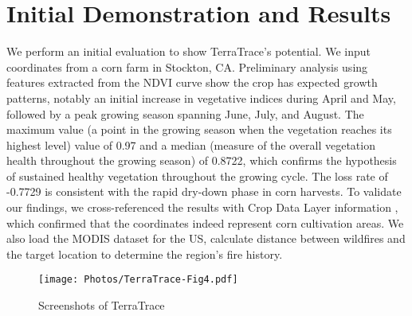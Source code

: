 \section{Initial Demonstration and Results}
We perform an initial evaluation to show TerraTrace's potential. We input coordinates from a corn farm in Stockton, CA. Preliminary analysis using features extracted from the NDVI curve show the crop has expected growth patterns, notably an initial increase in vegetative indices during April and May, followed by a peak growing season spanning June, July, and August. The maximum value (a point in the growing season when the vegetation reaches its highest level) value of 0.97 and a median (measure of the overall vegetation health throughout the growing season) of 0.8722, which confirms the hypothesis of sustained healthy vegetation throughout the growing cycle. The loss rate of -0.7729 is consistent with the rapid dry-down phase in corn harvests. To validate our findings, we cross-referenced the results with Crop Data Layer information \cite{CropScape}, which confirmed that the coordinates indeed represent corn cultivation areas. We also load the MODIS dataset for the US, calculate distance between wildfires and the target location to determine the region's fire history. 



\begin{figure}[t]
    \texttt{[image: Photos/TerraTrace-Fig4.pdf]}
    \vspace{-0.5cm}
    \caption{Screenshots of TerraTrace}
    \label{fig:Fig4}
    \vspace{-0.7cm}
\end{figure}
